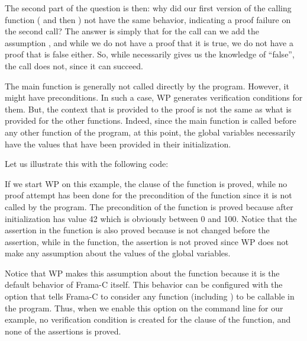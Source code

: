 The second part of the question is then: why did our first version of the
calling function ( and then )
not have the same behavior, indicating a proof failure on the second
call? The answer is simply that for the call  can we add
the assumption , and while we do not have a proof
that it is true, we do not have a proof that is false either. So, while
 necessarily gives us the knowledge of ``false'',
the call  does not, since it can succeed.




The main function is generally not called directly by the program. However,
it might have preconditions. In such a case, WP generates verification
conditions for them. But, the context that is provided to the proof is not
the same as what is provided for the other functions. Indeed, since the main
function is called before any other function of the program, at this point, the
global variables necessarily have the values that have been provided in their
initialization.

Let us illustrate this with the following code:




If we start WP on this example, the  clause of the
 function is proved, while no proof attempt has been done for
the precondition of the  function since it is not called by the
program. The precondition of the  function is proved because
after initialization  has value 42 which is obviously between
0 and 100. Notice that the assertion in the  function is also
proved because  is not changed before the assertion, while in the
 function, the assertion is not proved since WP does not make any
assumption about the values of the global variables.




Notice that WP makes this assumption about the  function
because it is the default behavior of Frama-C itself. This behavior can be
configured with the option  that tells Frama-C to
consider any function (including ) to be callable in the
program. Thus, when we enable this option on the command line for our example, no
verification condition is created for the  clause of the
 function, and none of the assertions is proved.


